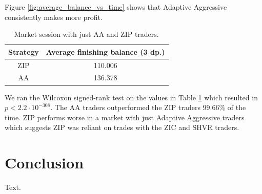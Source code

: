\documentclass[preprint]{acm_proc_article-sp} %
\begin{document}
Figure \ref{fig:average_balance_vs_time} shows that Adaptive Aggressive consistently makes more profit.

\begin{table}[H]
  \centering
  \begin{tabular}{ | c | c | }
    \hline
    Strategy & Average finishing balance (3 dp.) \\
    \hline
    ZIP & 110.006 \\
    AA & 136.378 \\
    \hline
  \end{tabular}
  \caption{Market session with just AA and ZIP traders.}
  \label{tbl:two_traders}
\end{table}

We ran the Wilcoxon signed-rank test on the values in Table
\ref{tbl:two_traders} which resulted in $p < 2.2 \cdot 10^{-308}$. The AA
traders outperformed the ZIP traders 99.66\% of the time. ZIP performs worse in
a market with just Adaptive Aggressive traders which suggests ZIP was reliant on trades with the
ZIC and SHVR traders.\\




\section{Conclusion} \label{sec:conclusion}
Text.\\



\end{document}

